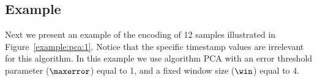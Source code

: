 


\clearpage




\subsection{Example}
\label{algo:pca:example}


Next we present an example of the encoding of 12 samples illustrated in Figure~\ref{example:pca:1}. Notice that the specific timestamp values are irrelevant for this algorithm. In this example we use algorithm PCA with an error threshold parameter ($\maxerror$) equal to 1, and a fixed window size ($\win$) equal to 4.



\vspace{-10pt}





